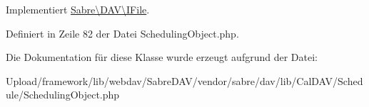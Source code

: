Implementiert \mbox{\hyperlink{interface_sabre_1_1_d_a_v_1_1_i_file_a0c30bc87b22d289f311c854f23993452}{Sabre\textbackslash{}\+D\+A\+V\textbackslash{}\+I\+File}}.



Definiert in Zeile 82 der Datei Scheduling\+Object.\+php.



Die Dokumentation für diese Klasse wurde erzeugt aufgrund der Datei\+:\begin{DoxyCompactItemize}
\item 
Upload/framework/lib/webdav/\+Sabre\+D\+A\+V/vendor/sabre/dav/lib/\+Cal\+D\+A\+V/\+Schedule/Scheduling\+Object.\+php\end{DoxyCompactItemize}
